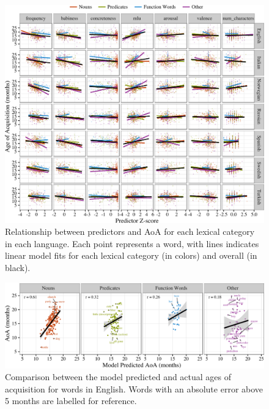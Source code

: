 \documentclass[10pt, letterpaper]{article}
\newenvironment{CodeChunk}{}{}
\begin{document}
\begin{CodeChunk}
\begin{figure}[tb]

{\centering \includegraphics{figs/data-1} 

}

\caption[Relationship between predictors and AoA for each lexical category in each language]{Relationship between predictors and AoA for each lexical category in each language. Each point represents a word, with lines indicates linear model fits for each lexical category (in colors) and overall (in black).}\label{fig:data}
\end{figure}
\end{CodeChunk}

\begin{CodeChunk}
\begin{figure}[tb]

{\centering \includegraphics{figs/fit-1} 

}

\caption[Comparison between the model predicted and actual ages of acquisition for words in English]{Comparison between the model predicted and actual ages of acquisition for words in English. Words with an absolute error above 5 months are labelled for reference.}\label{fig:fit}
\end{figure}
\end{CodeChunk}
\end{document}
